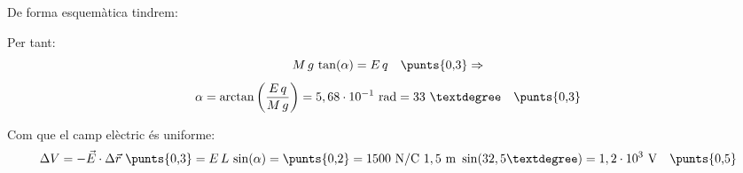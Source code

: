 \begin{solapartat}
De forma esquemàtica tindrem:

Per tant:
\[ M\,g\,\tan(\alpha) = E\,q \quad \text{\punts{0,3}} \Rightarrow \]
\[ \alpha = \arctan\left(\frac{E\,q}{M\,g}\right) = 5,68\cdot 10^{-1}\ \mathrm{rad} = 33\ ° \quad \text{\punts{0,3}} \]
\end{solapartat}

\begin{solapartat}
Com que el camp elèctric és uniforme:
\[ \Delta V = -\vec{E}\cdot\Delta\vec{r}\ \text{\punts{0,3}} = E\,L\,\sin(\alpha) = \text{\punts{0,2}} = 1500\ \mathrm{N/C}\ 1,5\ \mathrm{m}\ \sin(32,5°) = 1,2\cdot 10^{3}\ \mathrm{V} \quad \text{\punts{0,5}} \]
\end{solapartat}
